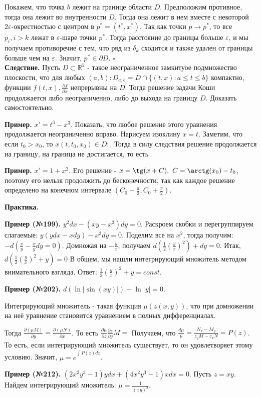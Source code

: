 Покажем, что точка $b$ лежит на границе области  $D$. Предположим противное,
тогда она лежит во внутренности $D$. Тогда она лежит в нем вместе
с некоторой $2\varepsilon$-окрестностью с центром в $p^*=(t^*,x^*)$.
Так как точки $p\to p^*$, то  все $p_i,i>k$ лежат в  $\varepsilon$-шаре
точки $p^*$. Тогда расстояние до границы больше  $\varepsilon$, 
и мы получаем противоречие с тем, что ряд из $\delta_k$ сходится и также
удален от границы больше чем на $\varepsilon$. Значит, $p^*\in \partial D$.
$\square$ \\
\textbf{Следствие.} Пусть $D\subset \mathbb{R}^2$ - такое неограниченное 
замкнтуое 
подмножество плоскости, что для любых $(a,b):D_{a,b}=D\cap \{
(t,x):a\leqslant t\leqslant b\}$ компактно, функции 
$f(t,x),\frac{\partial f}{\partial x}$ непрерывны на $D$. Тогда 
решение задачи Коши продолжается либо неограниченно, либо до выхода на границу
 $D$. Доказать самостоятельно. 

\textbf{Пример.} $x'=t^3-x^3$. Показать, что любое решение этого
уравнения продолжается неограниченно вправо.  Нарисуем изоклину $x=t$. 
Заметим, что если $t_0>x_0$, то $x(t,t_0,x_0)\in D:$. Тогда в силу следствия
решение продолжается на границу, на граница не достигается, то есть

\textbf{Пример.} $x'=1+x^2$. 
Его решение - $x=\tg(x+C),~C=\arctg(x_0)-t_0$, 
поэтому его нельзя продолжить до бесконечности,
так как каждое решение определено на конечном интервале $(C_0-\frac{\pi}{2},
C_0+\frac{\pi}{2})$. 

\textbf{Практика.}

\textbf{Пример (№199).} $y^2dx-(xy-x^3)dy=0$. Раскроем скобки и перегруппируем
слагаемые: $y(ydx-xdy)-x^3dy=0$. Поделим все на  $x^2$, тогда получим:  
$-d\left( \frac{x}{y}-\frac{x}{y}dy=0 \right)$. Домножая на $- \frac{y}{x}$,
получаем $d\left( \frac{1}{2}\left( \frac{y}{x} \right)^2  \right) +dy=0$.
Итак, $d\left( \frac{1}{2}\left( \frac{y}{x} \right)^2 +y\right)=0$
В общем, мы нашли интегрирующий множитель методом внимательного взгляда. 
Ответ: $\frac{1}{2}\left( \frac{y}{x} \right)^2+y=const$.

\textbf{Пример (№202).} $d(\ln|\sin(xy)|)+\ln|y|=0$.

\begin{defin}
Интегрирующий множитель - такая функция $\mu(z(x,y))$, что при домножении на 
неё уравнение становится уравнением в полных дифференциалах.
\end{defin}
Тогда $\frac{\partial(\mu M)}{\partial y}=\frac{\partial(\mu N)}{\partial x}$.
То есть $\frac{\partial \mu}{\partial z}\frac{\partial z}{\partial y}M=
$
Получаем, что $\frac{d\mu}{\mu}= \frac{N_x-M_y}{z_yM-z_xN}=P(z)$. То есть, если
интегрирующий множитель существует, то он удовлетворяет этому условию. 
Значит, $\mu=e^{\int\limits_{}^{} P(z)dz}$.

\textbf{Пример (№212).} $(2x^2y^3-1)ydx+(4x^2y^3-1)xdx=0$.
Пусть $z=xy$. Найдем интегрирующий множитель: $\mu=\frac{1}{(xy)^2}$.


